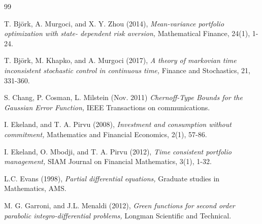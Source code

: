 \documentclass[11pt, psfig]{article}
\theoremstyle{definition}
\theoremstyle{remark}
\numberwithin{equation}{section}
\begin{document}
\begin{thebibliography}{99}

 T. Bj\"{o}rk, A. Murgoci, and X. Y. Zhou (2014), \textit{Mean-variance portfolio optimization with state- dependent risk aversion,} Mathematical Finance, 24(1), 1-24.

 T. Bj\"{o}rk, M. Khapko, and A. Murgoci (2017), \textit{A theory of markovian time inconsistent stochastic control in continuous time,} Finance and Stochastics, 21, 331-360.


 S. Chang, P. Cosman, L. Milstein (Nov. 2011) \textit{ Chernoff-Type Bounds for the Gaussian Error Function,} IEEE Transactions on communications.



 I. Ekeland, and T. A. Pirvu (2008),  \textit{Investment and consumption without commitment,} Mathematics and Financial Economics, 2(1), 57-86.

 I. Ekeland, O. Mbodji, and T. A. Pirvu (2012),   \textit{Time consistent portfolio management,} SIAM Journal on Financial Mathematics, 3(1), 1-32.

 L.C. Evans  (1998), \textit{Partial differential equations,} Graduate studies in Mathematics, AMS.




 M. G. Garroni, and J.L. Menaldi  (2012), \textit{Green functions for second order parabolic integro-differential problems,} Longman Scientific and Technical.




\end{thebibliography}
\end{document}
